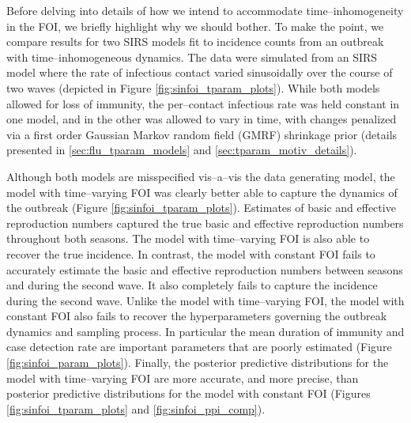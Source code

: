 Before delving into details of how we intend to accommodate time--inhomogeneity in the FOI, we briefly highlight why we should bother. To make the point, we compare results for two SIRS models fit to incidence counts from an outbreak with time--inhomogeneous dynamics. The data were simulated from an SIRS model where the rate of infectious contact varied sinusoidally over the course of two waves (depicted in Figure \ref{fig:sinfoi_tparam_plots}). While both models allowed for loss of immunity, the per--contact infectious rate was held constant in one model, and in the other was allowed to vary in time, with changes penalized via a first order Gaussian Markov random field (GMRF) shrinkage prior (details presented in \ref{sec:flu_tparam_models} and \ref{sec:tparam_motiv_details}). 

Although both models are misspecified vis--a--vis the  data generating model, the model with time--varying FOI was clearly better able to capture the dynamics of the outbreak (Figure \ref{fig:sinfoi_tparam_plots}). Estimates of basic and effective reproduction numbers captured the true basic and effective reproduction numbers throughout both seasons. The model with time--varying FOI is also able to recover the true incidence. In contrast, the model with constant FOI fails to accurately estimate the basic and effective reproduction numbers between seasons and during the second wave. It also completely fails to capture the incidence during the second wave. Unlike the model with time--varying FOI, the model with constant FOI also fails to recover the hyperparameters governing the outbreak dynamics and sampling process. In particular the mean duration of immunity and case detection rate are important parameters that are poorly estimated (Figure \ref{fig:sinfoi_param_plots}). Finally, the posterior predictive distributions for the model with time--varying FOI are more accurate, and more precise, than posterior predictive distributions for the model with constant FOI (Figures \ref{fig:sinfoi_tparam_plots} and \ref{fig:sinfoi_ppi_comp}).

